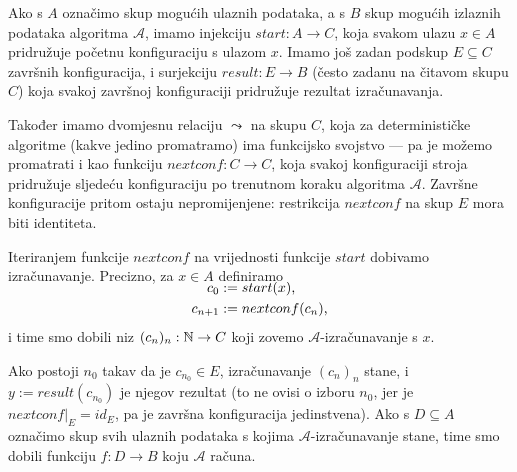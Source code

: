 Ako s $A$ označimo skup mogućih ulaznih podataka, a s $B$ skup mogućih izlaznih podataka algoritma $\mathcal A$, imamo injekciju $start:A\to C$, koja svakom ulazu $x\in A$ pridružuje početnu konfiguraciju s ulazom $x$. Imamo još zadan podskup $E\subseteq C$ završnih konfiguracija, i surjekciju $result:E\to B$ (često zadanu na čitavom skupu $C$) koja svakoj završnoj konfiguraciji pridružuje rezultat izračunavanja.

Također imamo dvomjesnu relaciju $\leadsto$ na skupu $C$, koja za determinističke algoritme (kakve jedino promatramo) ima funkcijsko svojstvo --- pa je možemo promatrati i kao funkciju $nextconf:C\to C$, koja svakoj konfiguraciji stroja pridružuje sljedeću konfiguraciju po trenutnom koraku algoritma $\mathcal A$. Završne konfiguracije pritom ostaju nepromijenjene: restrikcija $nextconf$ na skup $E$ mora biti identiteta.

Iteriranjem funkcije $nextconf$ na vrijednosti funkcije $start$ dobivamo izračunavanje. Precizno, za $x\in A$ definiramo
\begin{align}
\SwapAboveDisplaySkip
    c_0&:=start(x)\text,\\
    c_{n+1}&:=nextconf(c_n)\text,
\end{align}
i time smo dobili niz $(c_n)_n:{\mathbb N}\to C$ koji zovemo $\mathcal A$-izračunavanje s $x$.

Ako postoji $n_0$ takav da je $c_{n_0}\in E$, izračunavanje $(c_n)_n$ stane, i $y:=result(c_{n_0})$ je njegov rezultat (to ne ovisi o izboru $n_0$, jer je $nextconf|_E=id_E$, pa je završna konfiguracija jedinstvena). Ako s $D\subseteq A$ označimo skup svih ulaznih podataka s kojima $\mathcal A$-izračunavanje stane, time smo dobili funkciju $f:D\to B$ koju $\mathcal A$ računa.
\vspace{-5mm}

